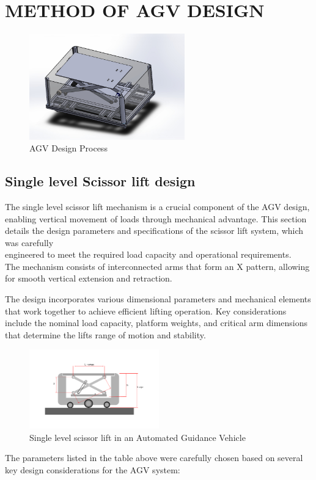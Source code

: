 \documentclass[../../main]{subfiles}
\begin{document}
\section{METHOD OF AGV DESIGN}
\begin{figure}[ht]
  \centering
  \includegraphics[width=0.6\textwidth]{img/image1.jpg}
  \caption{AGV Design Process}
\end{figure}

\subsection{Single level Scissor lift design}

The single level scissor lift mechanism is a crucial component of the
AGV design,\\ enabling vertical movement of loads through mechanical
advantage. This section details the design parameters and specifications
of the scissor lift system, which was carefully\\ engineered to meet the
required load capacity and operational requirements.\\The mechanism
consists of interconnected arms that form an
\textquotesingle X\textquotesingle{} pattern, allowing for smooth
vertical extension and retraction.

The design incorporates various dimensional parameters and mechanical
elements that work together to achieve efficient lifting operation. Key
considerations include the nominal load capacity, platform weights, and
critical arm dimensions that determine the lift\textquotesingle s range
of motion and stability.

\begin{figure}[h]
\centering
\includegraphics[width=0.5\textwidth]{img/image003.png}
\caption{Single level scissor lift in an Automated Guidance Vehicle}
\end{figure}
\newpage
The parameters listed in the table above were carefully chosen based on
several key design considerations for the AGV system:
\end{document}
